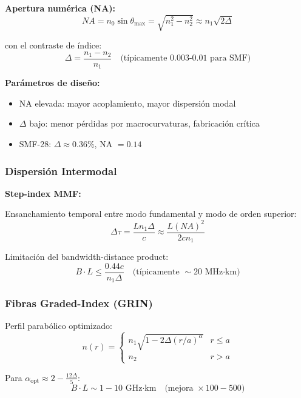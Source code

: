 \documentclass[11pt,a4paper]{article}
\begin{document}
\textbf{Apertura numérica (NA):}
\begin{equation}
    NA = n_0\sin\theta_{\text{max}} = \sqrt{n_1^2 - n_2^2} \approx n_1\sqrt{2\Delta}
\end{equation}

con el contraste de índice:
\begin{equation}
    \Delta = \frac{n_1 - n_2}{n_1} \quad \text{(típicamente 0.003-0.01 para SMF)}
\end{equation}

\textbf{Parámetros de diseño:}
\begin{itemize}
    \item NA elevada: mayor acoplamiento, mayor dispersión modal
    \item $\Delta$ bajo: menor pérdidas por macrocurvaturas, fabricación crítica
    \item SMF-28: $\Delta \approx 0.36\%$, NA $= 0.14$
\end{itemize}

\subsubsection{Dispersión Intermodal}

\textbf{Step-index MMF:}

Ensanchamiento temporal entre modo fundamental y modo de orden superior:
\begin{equation}
    \Delta \tau = \frac{L n_1 \Delta}{c} \approx \frac{L(NA)^2}{2cn_1}
\end{equation}

Limitación del bandwidth-distance product:
\begin{equation}
    B \cdot L \leq \frac{0.44c}{n_1\Delta} \quad \text{(típicamente } \sim 20 \text{ MHz·km)}
\end{equation}

\subsubsection{Fibras Graded-Index (GRIN)}

Perfil parabólico optimizado:
\begin{equation}
    n(r) = \begin{cases}
    n_1\sqrt{1 - 2\Delta(r/a)^\alpha} & r \leq a \\
    n_2 & r > a
    \end{cases}
\end{equation}

Para $\alpha_{\text{opt}} \approx 2 - \frac{12\Delta}{5}$:
\begin{equation}
    B \cdot L \sim 1-10 \text{ GHz·km} \quad \text{(mejora } \times 100-500\text{)}
\end{equation}
\end{document}
